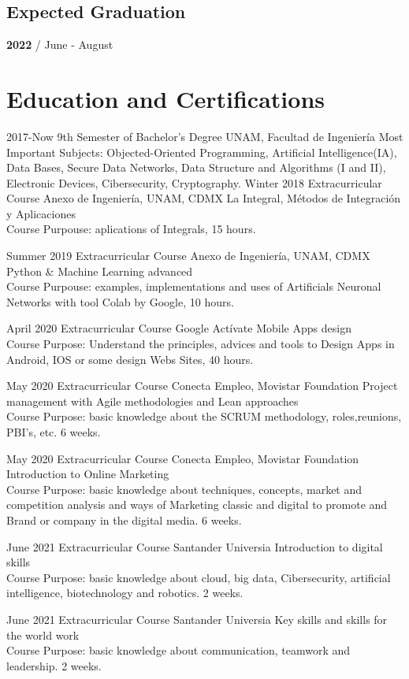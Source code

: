 \documentclass[]{friggeri-cv}
\begin{document}
\begin{aside}
    \section{Expected Graduation}
    \textbf{2022} / June - August 
    ~
     ~
\end{aside}

\section{Education and Certifications}
\begin{entrylist}
\entry
    {2017-Now}
    {9th Semester of Bachelor's Degree}
    {UNAM, Facultad de Ingeniería}
    {Most Important Subjects: Objected-Oriented Programming, Artificial Intelligence(IA), Data Bases, Secure Data Networks, Data Structure and Algorithms (I and II), Electronic Devices, Cibersecurity, Cryptography.
    }
\entry
    {Winter 2018}
    {Extracurricular Course}
    {Anexo de Ingeniería, UNAM, CDMX}
    {La Integral, Métodos de Integración y Aplicaciones\\
    Course Purpouse: aplications of Integrals, 15 hours.}

\entry
    {Summer 2019}
    {Extracurricular Course}
    {Anexo de Ingeniería, UNAM, CDMX}
    {Python \& Machine Learning advanced\\
    Course Purpouse: examples, implementations and uses of Artificials Neuronal Networks with tool Colab by Google, 10 hours.}
    
\entry
    {April 2020}
    {Extracurricular Course}
    {Google Actívate}
    {Mobile Apps design\\
    Course Purpose: Understand the principles, advices and tools to Design Apps in Android, IOS or some design Webs Sites, 40 hours.}
    
\entry
    {May 2020}
    {Extracurricular Course}
    {Conecta Empleo, Movistar Foundation}
    {Project management with Agile methodologies and Lean approaches\\
    Course Purpose: basic knowledge about the SCRUM methodology, roles,reunions, PBI's, etc. 6 weeks.}    

\entry
    {May 2020}
    {Extracurricular Course}
    {Conecta Empleo, Movistar Foundation}
    {Introduction to Online Marketing\\
    Course Purpose: basic knowledge about techniques, concepts, market and competition analysis and ways of Marketing classic and digital to promote and Brand or company in the digital media. 6 weeks. }
    
\entry
    {June 2021}
    {Extracurricular Course}
    {Santander Universia}
    {Introduction to digital skills\\
    Course Purpose: basic knowledge about cloud, big data, Cibersecurity, artificial intelligence, biotechnology and robotics. 2 weeks.}

\entry
    {June 2021}
    {Extracurricular Course}
    {Santander Universia}
    {Key skills and skills for the world work\\
    Course Purpose: basic knowledge about communication, teamwork and leadership. 2 weeks. }
    
\end{entrylist}
\end{document}
